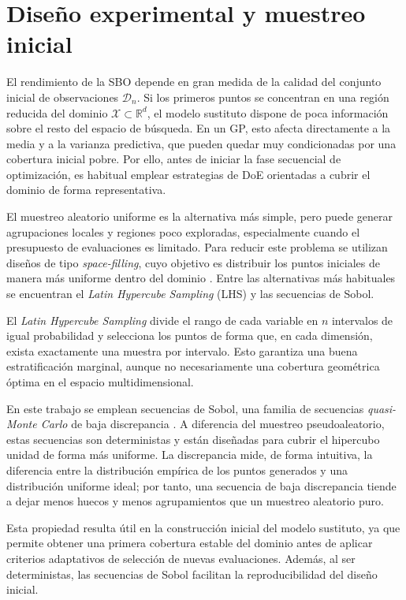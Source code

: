 \section{Diseño experimental y muestreo inicial}
\label{sec:muestreo_inicial}

El rendimiento de la SBO depende en gran
medida de la calidad del conjunto inicial de observaciones \(\mathcal{D}_n\). Si los primeros
puntos se concentran en una región reducida del dominio \(\mathcal{X}\subset\mathbb{R}^d\),
el modelo sustituto dispone de poca información sobre el resto del espacio de búsqueda. En
un GP, esto afecta directamente a la media y a la varianza predictiva, que
pueden quedar muy condicionadas por una cobertura inicial pobre. Por ello, antes de iniciar
la fase secuencial de optimización, es habitual emplear estrategias de DoE orientadas a cubrir el dominio de forma representativa.

El muestreo aleatorio uniforme es la alternativa más simple, pero puede generar agrupaciones
locales y regiones poco exploradas, especialmente cuando el presupuesto de evaluaciones es
limitado. Para reducir este problema se utilizan diseños de tipo \emph{space-filling}, cuyo
objetivo es distribuir los puntos iniciales de manera más uniforme dentro del dominio
\cite{forrester2008engineering}. Entre las alternativas más habituales se encuentran el
\emph{Latin Hypercube Sampling} (LHS) y las secuencias de Sobol.

El \emph{Latin Hypercube Sampling} divide el rango de cada variable en \(n\) intervalos de
igual probabilidad y selecciona los puntos de forma que, en cada dimensión, exista
exactamente una muestra por intervalo. Esto garantiza una buena estratificación marginal,
aunque no necesariamente una cobertura geométrica óptima en el espacio multidimensional.

En este trabajo se emplean secuencias de Sobol, una familia de secuencias
\emph{quasi-Monte Carlo} de baja discrepancia \cite{sobol1967distribution}. A diferencia del
muestreo pseudoaleatorio, estas secuencias son deterministas y están diseñadas para cubrir
el hipercubo unidad de forma más uniforme. La discrepancia mide, de forma intuitiva, la
diferencia entre la distribución empírica de los puntos generados y una distribución uniforme
ideal; por tanto, una secuencia de baja discrepancia tiende a dejar menos huecos y menos
agrupamientos que un muestreo aleatorio puro.

Esta propiedad resulta útil en la construcción inicial del modelo sustituto, ya que permite
obtener una primera cobertura estable del dominio antes de aplicar criterios adaptativos de
selección de nuevas evaluaciones. Además, al ser deterministas, las secuencias de Sobol
facilitan la reproducibilidad del diseño inicial.

